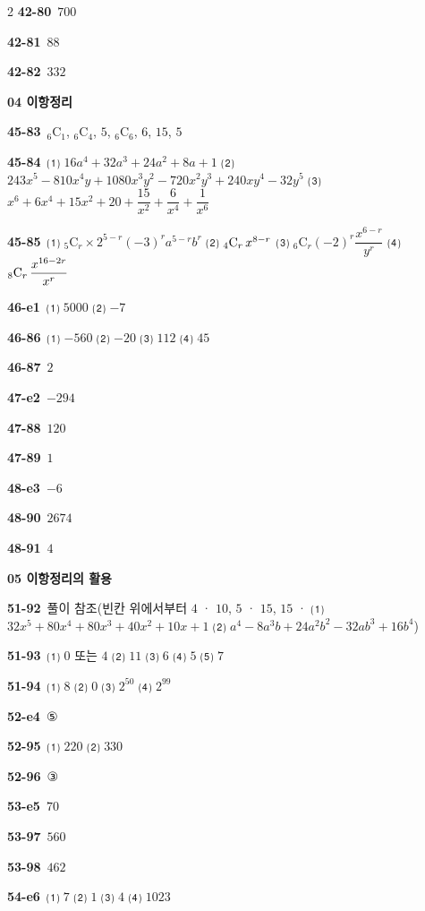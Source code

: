 \documentclass[10pt,a4paper]{article}
\begin{document}
\begin{multicols}{2}
\noindent\textbf{42-80}\ $700$\par
\noindent\textbf{42-81}\ $88$\par
\noindent\textbf{42-82}\ $332$\par
\noindent\textbf{04 이항정리}\par\smallskip
\noindent\textbf{45-83}\ ${}_6\mathrm{C}_1$, ${}_6\mathrm{C}_4$, $5$, ${}_6\mathrm{C}_6$, $6$, $15$, $5$\par
\noindent\textbf{45-84}\ ⑴ $16a^4+32a^3+24a^2+8a+1$ ⑵ $243x^5-810x^4y+1080x^3y^2-720x^2y^3+240xy^4-32y^5$ ⑶ $x^6+6x^4+15x^2+20+\dfrac{15}{x^2}+\dfrac{6}{x^4}+\dfrac{1}{x^6}$\par
\noindent\textbf{45-85}\ ⑴ ${}_5\mathrm{C}_r\times 2^{5-r}(-3)^r a^{5-r}b^r$ ⑵ ${}_4\mathrm{C}_r\mkern3mu  x^{8-r}$ ⑶ ${}_6\mathrm{C}_r(-2)^r\dfrac{x^{6-r}}{y^r}$ ⑷ ${}_8\mathrm{C}_r\mkern3mu \dfrac{x^{16-2r}}{x^r}$\par
\noindent\textbf{46-e1}\ ⑴ $5000$ ⑵ $-7$\par
\noindent\textbf{46-86}\ ⑴ $-560$ ⑵ $-20$ ⑶ $112$ ⑷ $45$\par
\noindent\textbf{46-87}\ $2$\par
\noindent\textbf{47-e2}\ $-294$\par
\noindent\textbf{47-88}\ $120$\par
\noindent\textbf{47-89}\ $1$\par
\noindent\textbf{48-e3}\ $-6$\par
\noindent\textbf{48-90}\ $2674$\par
\noindent\textbf{48-91}\ $4$\par
\noindent\textbf{05 이항정리의 활용}\par\smallskip
\noindent\textbf{51-92}\ 풀이 참조(빈칸 위에서부터 $4$ · $10$, $5$ · $15$, $15$ · ⑴ $32x^5+80x^4+80x^3+40x^2+10x+1$ ⑵ $a^4-8a^3b+24a^2b^2-32ab^3+16b^4$)\par
\noindent\textbf{51-93}\ ⑴ $0$ 또는 $4$ ⑵ $11$ ⑶ $6$ ⑷ $5$ ⑸ $7$\par
\noindent\textbf{51-94}\ ⑴ $8$ ⑵ $0$ ⑶ $2^{50}$ ⑷ $2^{99}$\par
\noindent\textbf{52-e4}\ ⑤\par
\noindent\textbf{52-95}\ ⑴ $220$ ⑵ $330$\par
\noindent\textbf{52-96}\ ③\par
\noindent\textbf{53-e5}\ $70$\par
\noindent\textbf{53-97}\ $560$\par
\noindent\textbf{53-98}\ $462$\par
\noindent\textbf{54-e6}\ ⑴ $7$ ⑵ $1$ ⑶ $4$ ⑷ $1023$\par

\end{multicols}
\end{document}
